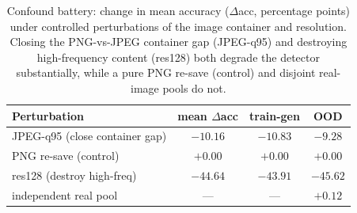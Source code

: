 \begin{table}[t]
  \centering
  \caption{Confound battery: change in mean accuracy ($\Delta$acc, percentage points) under controlled
  perturbations of the image container and resolution. Closing the PNG-vs-JPEG container gap (JPEG-q95) and
  destroying high-frequency content (res128) both degrade the detector substantially, while a pure PNG re-save
  (control) and disjoint real-image pools do not.}
  \label{tab:confound}
  \small
  \begin{tabular}{lccc}
    \toprule
    Perturbation & mean $\Delta$acc & train-gen & OOD \\
    \midrule
    JPEG-q95 (close container gap)  & $-10.16$ & $-10.83$ & $-9.28$ \\
    PNG re-save (control)           & $+0.00$  & $+0.00$  & $+0.00$ \\
    res128 (destroy high-freq)      & $-44.64$ & $-43.91$ & $-45.62$ \\
    independent real pool           & ---      & ---      & $+0.12$ \\
    \bottomrule
  \end{tabular}
\end{table}
